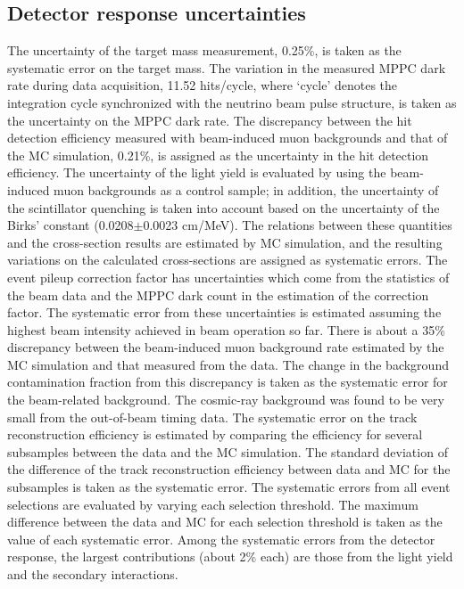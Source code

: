 \documentclass[%
 reprint,
superscriptaddress,
 amsmath,amssymb,
 aps,
]{revtex4-1}
\begin{document}
\subsection{Detector response uncertainties}
The uncertainty of the target mass measurement, 0.25\%, is taken as the systematic error on the target mass.
The variation in the measured MPPC dark rate during data acquisition, 11.52 hits/cycle, where `cycle' denotes the integration cycle synchronized with the neutrino beam pulse structure, is taken as the uncertainty on the MPPC dark rate.
The discrepancy between the hit detection efficiency measured with beam-induced muon backgrounds and that of the MC simulation, 0.21\%, is assigned as the uncertainty in the hit detection efficiency.
The uncertainty of the light yield is evaluated by using the beam-induced muon backgrounds as a control sample; in addition, the uncertainty of the scintillator quenching is taken into account based on the uncertainty of the Birks' constant (0.0208$\pm$0.0023 cm/MeV).
The relations between these quantities and the cross-section results are estimated by MC simulation, and the resulting variations on the calculated cross-sections are assigned as systematic errors.
The event pileup correction factor has uncertainties which come from the statistics of the beam data and the MPPC dark count in the estimation of the correction factor.
The systematic error from these uncertainties is estimated assuming the highest beam intensity achieved in beam operation so far.
There is about a 35\% discrepancy between the beam-induced muon background rate estimated by the MC simulation and that measured from the data.
The change in the background contamination fraction from this discrepancy is taken as the systematic error for the beam-related background.
The cosmic-ray background was found to be very small from the out-of-beam timing data.
The systematic error on the track reconstruction efficiency is estimated by comparing the efficiency for several subsamples between the data and the MC simulation.
The standard deviation of the difference of the track reconstruction efficiency between data and MC for the subsamples is taken as the systematic error.
The systematic errors from all event selections are evaluated by varying each selection threshold.
The maximum difference between the data and MC for each selection threshold is taken as the value of each systematic error.
Among the systematic errors from the detector response, the largest contributions (about 2\% each) are those from the light yield and the secondary interactions.
\end{document}
